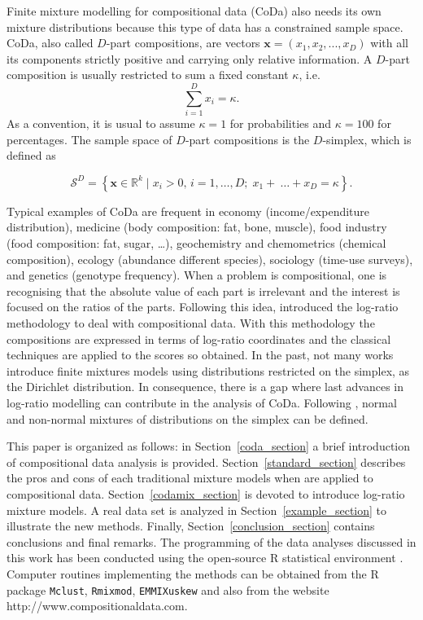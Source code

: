 \documentclass[preprint, review, 3p, authoryear]{elsarticle}
\begin{document}
Finite mixture modelling for compositional data (CoDa) also needs its own mixture distributions because this type of data has a constrained sample space.
CoDa, also called $D$-part compositions, are vectors $\textbf{x} = (x_1, x_2, ..., x_D)$ with all its components strictly positive  and carrying only relative information. A $D$-part composition is usually restricted to sum a fixed constant $\kappa$, i.e.
\begin{equation}
\sum_{i=1 }^D x_i = \kappa.
\label{sum_to_constant}
\end{equation}
As a convention, it is usual to assume $\kappa =1$ for probabilities and $\kappa = 100$ for percentages. The sample space of $D$-part compositions is the $D$-simplex, which is defined as

\[
\mathcal{S}^D = \left\{ \textbf{x} \in \mathbb{R}^k \;|\; x_i > 0,\, i=1,\dots, D;\; x_1 + \
\dots + x_D = \kappa \right\}.
\]

Typical examples of CoDa are frequent in economy (income/expenditure distribution), medicine (body composition: fat, bone, muscle), food industry (food composition: fat, sugar, …), geochemistry and chemometrics (chemical composition), ecology (abundance different species), sociology (time-use surveys), and genetics (genotype frequency). 
When a problem is compositional, one is recognising that the absolute value of each part is irrelevant and the interest is focused on the ratios of the parts. Following this idea, \cite{aitchison1986statistical} introduced the log-ratio methodology to deal with compositional data. With this methodology 
the compositions are expressed in terms of log-ratio coordinates and the classical techniques are applied to the scores so obtained.
In the past, not many works \citep[e.g.,][]{albert1982mixtures, bouguila2004unsupervised} introduce finite mixtures models using distributions restricted on the simplex, as the Dirichlet distribution. In consequence, there is a gap where last advances in 
log-ratio modelling can contribute in the analysis of CoDa. Following \cite{mateu2013normal}, normal and non-normal mixtures of distributions on the simplex 
can be defined.

This paper is organized as follows: in Section~\ref{coda_section} a brief introduction of compositional data analysis is provided. Section~\ref{standard_section} describes the pros and cons of each traditional mixture models when are applied to compositional data. Section~\ref{codamix_section} is devoted to introduce log-ratio mixture models. A real data set is analyzed in Section~\ref{example_section} to illustrate the new methods. Finally, Section~\ref{conclusion_section} contains conclusions and final remarks. The programming of the data analyses discussed in this work has been conducted using the open-source R statistical environment \citep{R2013soft}. Computer routines implementing the methods can be obtained from the R package \texttt{Mclust}, \texttt{Rmixmod}, \texttt{EMMIXuskew} and also from the website http://www.compositionaldata.com.
\end{document}
